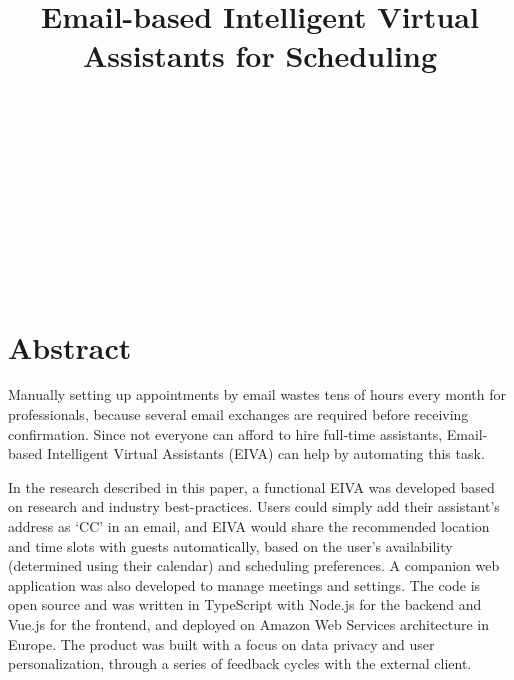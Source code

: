 \documentclass{article}
\title{{\titlefont \linespread{1.5} Email-based Intelligent Virtual Assistants for Scheduling}}
\begin{document}

\vspace*{\fill}
\begin{center}
	\\
	\vspace{3mm}
	\\
	\vspace{40mm}
	\\
	\vspace{3mm}
	\\
	\vspace{40mm}
	\\
	\vspace{3mm}
	\\
	\vspace{40mm}
	\\
	\vspace{3mm}
	\\
\end{center}
\vspace*{\fill}

\newpage


\section*{Abstract}

Manually setting up appointments by email wastes tens of hours every month for professionals, because several email exchanges are required before receiving confirmation. Since not everyone can afford to hire full-time assistants, Email-based Intelligent Virtual Assistants (EIVA) can help by automating this task.

In the research described in this paper, a functional EIVA was developed based on research and industry best-practices. Users could simply add their assistant's address as `CC' in an email, and EIVA would share the recommended location and time slots with guests automatically, based on the user's availability (determined using their calendar) and scheduling preferences. A companion web application was also developed to manage meetings and settings. The code is open source and was written in TypeScript with Node.js for the backend and Vue.js for the frontend, and deployed on Amazon Web Services architecture in Europe. The product was built with a focus on data privacy and user personalization, through a series of feedback cycles with the external client.
\end{document}
